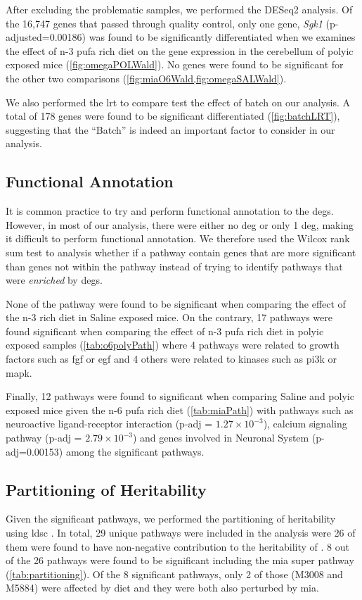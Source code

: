After excluding the problematic samples, we performed the DESeq2 analysis.
Of the 16,747 genes that passed through quality control, only one gene, \textit{Sgk1} (p-adjusted=0.00186) was found to be significantly differentiated when we examines the effect of n-3 \gls{pufa} rich diet on the gene expression in the cerebellum of \gls{polyic} exposed mice (\cref{fig:omegaPOLWald}).
No genes were found to be significant for the other two comparisons (\cref{fig:miaO6Wald,fig:omegaSALWald}).

We also performed the \gls{lrt} to compare test the effect of batch on our analysis. 
A total of 178 genes were found to be significant differentiated (\cref{fig:batchLRT}), suggesting that the ``Batch'' is indeed an important factor to consider in our analysis.

\subsection{Functional Annotation}
It is common practice to try and perform functional annotation to the \glspl{deg}. 
However, in most of our analysis, there were either no \gls{deg} or only 1 \gls{deg}, making it difficult to perform functional annotation.
We therefore used the Wilcox rank sum test to analysis whether if a pathway contain genes that are more significant than genes not within the pathway instead of trying to identify pathways that were \emph{enriched} by \glspl{deg}.

None of the pathway were found to be significant when comparing the effect of the n-3 rich diet in Saline exposed mice. 
On the contrary, 17 pathways were found significant when comparing the effect of n-3 \gls{pufa} rich diet in \gls{polyic} exposed samples (\cref{tab:o6polyPath}) where 4 pathways were related to growth factors such as \gls{fgf} or \gls{egf} and 4 others were related to kinases such as \gls{pi3k} or \gls{mapk}.

Finally, 12 pathways were found to significant when comparing Saline and \gls{polyic} exposed mice given the n-6 \gls{pufa} rich diet (\cref{tab:miaPath}) with pathways such as neuroactive ligand-receptor interaction (p-adj = $1.27\times10^{-3}$), calcium signaling pathway (p-adj = $2.79\times10^{-3}$) and genes involved in Neuronal System (p-adj=0.00153) among the significant pathways.

\subsection{Partitioning of Heritability}
Given the significant pathways, we performed the partitioning of heritability using \gls{ldsc} \citep{Bulik-Sullivan2015}.
In total, 29 unique pathways were included in the analysis were 26 of them were found to have non-negative contribution to the heritability of .
8 out of the 26 pathways were found to be significant including the \gls{mia} super pathway (\cref{tab:partitioning}).
Of the 8 significant pathways, only 2 of those (M3008 and M5884) were affected by diet and they were both also perturbed by \gls{mia}.

